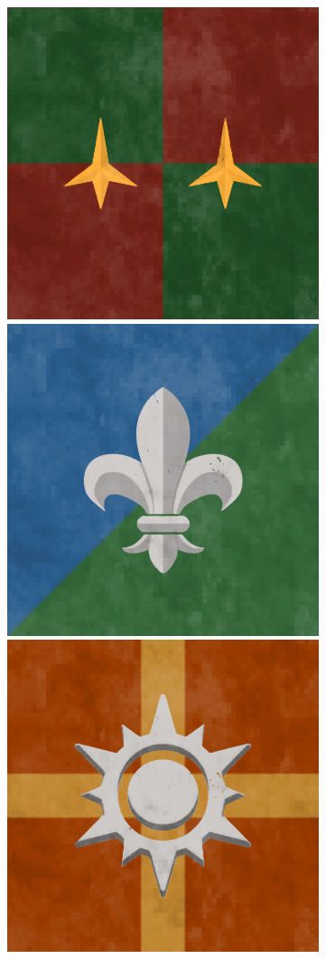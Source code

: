 \begin{figure}[!ht]
        \includegraphics[scale=0.25]{img/flag/fnc.png}
        \includegraphics[scale=0.25]{img/flag/fsn.png}
        \includegraphics[scale=0.25]{img/flag/hereroq.png}

\end{figure}
